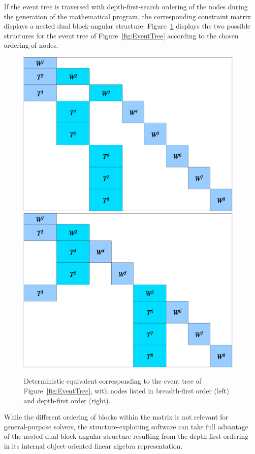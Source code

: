 If the event tree is traversed with depth-first-search ordering of the 
nodes during the generation of the mathematical program, the 
corresponding constraint matrix displays a nested dual block-angular 
structure.
Figure~\ref{fig:deteq} displays the two possible structures 
for the event tree of Figure~\ref{fig:EventTree} according 
to the chosen ordering of nodes.
%
\begin{figure}[ht]
  \centering
    \includegraphics[scale=0.37]{figures/deteq-bfs.eps} \hfill
    \includegraphics[scale=0.37]{figures/deteq-dfs.eps}
    \caption{Deterministic equivalent corresponding to the event tree 
             of Figure~\ref{fig:EventTree}, with nodes listed in breadth-first 
             order (left) and depth-first order (right).}
    \label{fig:deteq}
\end{figure}
%
While the different ordering of blocks within the matrix is not 
relevant for general-purpose solvers, the structure-exploiting
software \OOPS \cite{GondzioGrothey07,GondzioSarkissian} can take 
full advantage of the nested dual-block angular structure resulting
from the depth-first ordering in its internal object-oriented
linear algebra representation.


